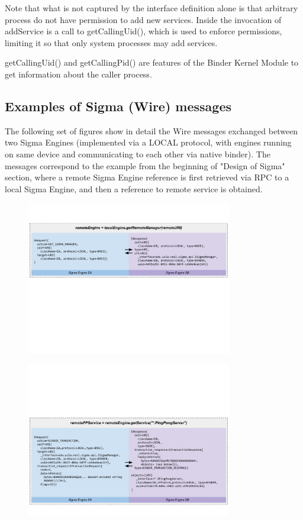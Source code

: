 \documentclass[prodmode]{acmlarge}
\begin{document}
Note that what is not captured by the interface definition alone is that arbitrary process do not have permission to add new services. Inside the invocation of addService is a call to getCallingUid(), which is used to enforce permissions, limiting it so that only system processes may add services.

getCallingUid() and getCallingPid() are features of the Binder Kernel Module to get information about the caller process.

\pagebreak[4]
\subsection{Examples of Sigma (Wire) messages}
\label{app:WireExchange}
The following set of figures show in detail the Wire messages exchanged between two Sigma Engines (implemented via a LOCAL protocol, with engines running on same device and communicating to each other via native binder). The messages correspond to the example from the beginning of "Design of Sigma" section, where a remote Sigma Engine reference is first retrieved via RPC to a local Sigma Engine, and then a reference to remote service is obtained.

\begin{figure}[h!]
\centering
\includegraphics[width=0.8\textwidth]{drawings/WireExchange1.pdf}
\end{figure}

\begin{figure}[h!]
\centering
\includegraphics[width=0.8\textwidth]{drawings/WireExchange2.pdf}
\end{figure}
\end{document}
